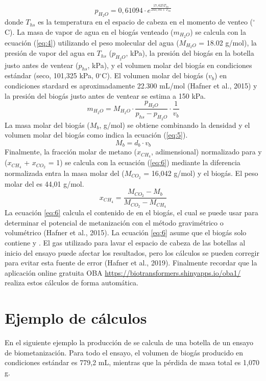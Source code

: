 \documentclass[spanish]{article}
\begin{document}
\begin{equation}
\label{eq:3_magnus}
   p_{H_2O} = 0,61094 \cdot e^{\frac{17,625 T_{hs}}{243,04 + T_{hs}}}
\end{equation}
donde $T_{hs}$ es la temperatura en el espacio de cabeza en el momento de venteo ($^\circ$C). 
La masa de vapor de agua en el biogás venteado ($m_{H_2O}$) se calcula con la ecuación (\ref{eq:4}) utilizando el peso molecular del agua  ($M_{H_2O}$ = 18.02 g/mol), la presión de vapor del agua en $T_{hs}$ ($p_{H_2O}$, kPa), la presión del biogás en la botella justo antes de ventear ($p_{hs}$, kPa), y el volumen molar del biogás en condiciones estándar (seco, 101,325 kPa, 0$^\circ$C). El volumen molar del biogás ($v_b$) en condiciones stardard es aproximadamente 22.300 mL/mol (Hafner et al., 2015) y la presión del biogás justo antes de ventear se estima a 150 kPa.
\begin{equation}
  \label{eq:4}
  m_{H_2O}=M_{H_2O} \cdot \frac{p_{H_2O}}{p_{hs}-p_{H_2O}} \cdot \frac{1}{v_b}
\end{equation}
La masa molar del biogás ($M_b$, g/mol) se obtiene combinando la densidad y el volumen molar del biogás como indica la ecuación (\ref{eq:5}).
\begin{equation}
  \label{eq:5}
  M_b=d_b \cdot v_b
\end{equation}
Finalmente, la fracción molar de  metano ($x_{CH_4}$, adimensional) normalizado para  y  ($x_{CH_4}$ + $x_{CO_2}$ = 1) se calcula con la ecuación (\ref{eq:6})  mediante la diferencia normalizada entra la masa molar del  ($M_{CO_2}$ = 16,042 g/mol) y el biogás. El peso molar del  es 44,01 g/mol.
\begin{equation}
  \label{eq:6}
  x_{CH_4}=\frac{M_{CO_2}-M_b}{M_{CO_2}-M_{CH_4}}
\end{equation}
La ecuación \ref{eq:6} calcula el contenido de  en el biogás, el cual se puede usar para determinar el potencial de metanización con el método gravimétrico o volumétrico (Hafner et al., 2015). La ecuación \ref{eq:6} asume que el biogás solo contiene  y . El gas utilizado para lavar el espacio de cabeza de las botellas al inicio del ensayo puede afectar los resultados, pero los cálculos se pueden corregir para evitar esta fuente de error (Hafner et al., 2019).
Finalmente recordar que la aplicación online gratuita OBA \url{ https://biotransformers.shinyapps.io/oba1/ } realiza estos cálculos de forma automática.
\section{Ejemplo de cálculos} \label{s_example}
En el siguiente ejemplo la producción de  se calcula de una botella de un ensayo de biometanización. Para todo el ensayo, el volumen de biogás producido en condiciones estándar es 779,2 mL, mientras que la pérdida de masa total es 1,070 g.
\end{document}
